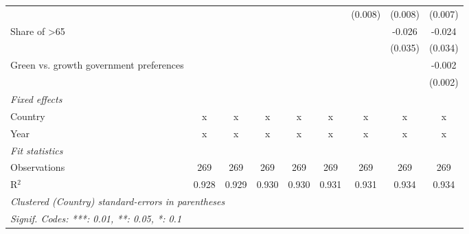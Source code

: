 \begin{table}[htbp]
\begin{tabular}{lcccccccc}
                                              &              &              &         &         &         & (0.008) & (0.008)     & (0.007)\\   
      Share of >65                            &              &              &         &         &         &         & -0.026      & -0.024\\   
                                              &              &              &         &         &         &         & (0.035)     & (0.034)\\   
      Green vs. growth government preferences &              &              &         &         &         &         &             & -0.002\\   
                                              &              &              &         &         &         &         &             & (0.002)\\   
      \emph{Fixed effects}\\
      Country                                 & x            & x            & x       & x       & x       & x       & x           & x\\  
      Year                                    & x            & x            & x       & x       & x       & x       & x           & x\\  
      \midrule \emph{Fit statistics}\\
      Observations                            & 269          & 269          & 269     & 269     & 269     & 269     & 269         & 269\\  
      R$^2$                                   & 0.928        & 0.929        & 0.930   & 0.930   & 0.931   & 0.931   & 0.934       & 0.934\\  
      \midrule
      \multicolumn{9}{l}{\emph{Clustered (Country) standard-errors in parentheses}}\\
      \multicolumn{9}{l}{\emph{Signif. Codes: ***: 0.01, **: 0.05, *: 0.1}}\\
   \end{tabular}
\end{table}


